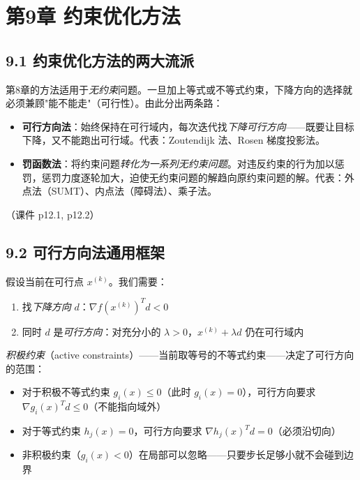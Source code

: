 \section{第9章 \quad 约束优化方法}

\subsection{9.1 约束优化方法的两大流派}

第8章的方法适用于\emph{无约束}问题。一旦加上等式或不等式约束，下降方向的选择就必须兼顾"能不能走"（可行性）。由此分出两条路：

\begin{itemize}
  \item \textbf{可行方向法}：始终保持在可行域内，每次迭代找\emph{下降可行方向}——既要让目标下降，又不能跑出可行域。代表：Zoutendijk 法、Rosen 梯度投影法。
  \item \textbf{罚函数法}：将约束问题\emph{转化为一系列无约束问题}。对违反约束的行为加以惩罚，惩罚力度逐轮加大，迫使无约束问题的解趋向原约束问题的解。代表：外点法（SUMT）、内点法（障碍法）、乘子法。
\end{itemize}

（课件 p12.1, p12.2）

\subsection{9.2 可行方向法通用框架}

假设当前在可行点 $x^{(k)}$。我们需要：
\begin{enumerate}
  \item 找\emph{下降方向} $d$：$\nabla f(x^{(k)})^T d < 0$
  \item 同时 $d$ 是\emph{可行方向}：对充分小的 $\lambda > 0$，$x^{(k)} + \lambda d$ 仍在可行域内
\end{enumerate}

\emph{积极约束}（active constraints）——当前取等号的不等式约束——决定了可行方向的范围：
\begin{itemize}
  \item 对于积极不等式约束 $g_i(x) \le 0$（此时 $g_i(x)=0$），可行方向要求 $\nabla g_i(x)^T d \le 0$（不能指向域外）
  \item 对于等式约束 $h_j(x)=0$，可行方向要求 $\nabla h_j(x)^T d = 0$（必须沿切向）
  \item 非积极约束（$g_i(x) < 0$）在局部可以忽略——只要步长足够小就不会碰到边界
\end{itemize}

